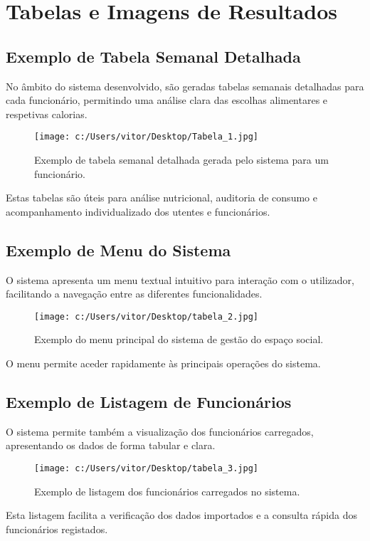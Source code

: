 \documentclass[a4paper,12pt]{report}
\begin{document}
\chapter{Tabelas e Imagens de Resultados}

\section{Exemplo de Tabela Semanal Detalhada}
No âmbito do sistema desenvolvido, são geradas tabelas semanais detalhadas para cada funcionário, permitindo uma análise clara das escolhas alimentares e respetivas calorias.
\begin{figure}[h!]
    \centering
    \texttt{[image: c:/Users/vitor/Desktop/Tabela\_1.jpg]}
\caption[Exemplo de tabela semanal detalhada gerada pelo sistema para um funcionário.]{Exemplo de tabela semanal detalhada gerada pelo sistema para um funcionário.}
    \label{fig:tabela-detalhada}
\end{figure}

Estas tabelas são úteis para análise nutricional, auditoria de consumo e acompanhamento individualizado dos utentes e funcionários.



\section{Exemplo de Menu do Sistema}
O sistema apresenta um menu textual intuitivo para interação com o utilizador, facilitando a navegação entre as diferentes funcionalidades. 
\begin{figure}[h!]
    \centering
    \texttt{[image: c:/Users/vitor/Desktop/tabela\_2.jpg]}
    \caption[Exemplo do menu principal do sistema de gestão do espaço social.]{Exemplo do menu principal do sistema de gestão do espaço social.}
    \label{fig:menu-principal}
\end{figure}
O menu permite aceder rapidamente às principais operações do sistema.


\section{Exemplo de Listagem de Funcionários}
O sistema permite também a visualização dos funcionários carregados, apresentando os dados de forma tabular e clara.
\begin{figure}[h!]
    \centering
    \texttt{[image: c:/Users/vitor/Desktop/tabela\_3.jpg]}
    \caption[Exemplo de listagem dos funcionários carregados no sistema.]{Exemplo de listagem dos funcionários carregados no sistema.}
    \label{fig:listagem-funcionarios}
\end{figure}
Esta listagem facilita a verificação dos dados importados e a consulta rápida dos funcionários registados.
\end{document}
